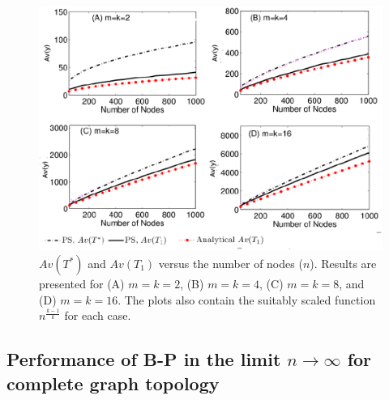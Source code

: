 \begin{figure}[htbp] 
\centering
\includegraphics[scale=0.36]{figs1/segSizeVsDelay_nrTrans_varyN_Mall_push_pull2.eps}
\caption{$Av(T^*)$ and $Av(T_1)$ versus the number of nodes ($n$). Results are presented for (A) $m=k=2$, (B) $m=k=4$, (C) $m=k=8$, and (D) $m=k=16$. The plots also contain the suitably scaled function $n^{\frac{k-1}{k}}$ for each case.}
\label{segSizeVsDelay_nrTrans_varyN_Mall_push_pull}
\end{figure}
\vspace{-3mm}
\subsection{Performance of B-P in the limit $n\rightarrow \infty$ for complete graph topology}
\vspace{-1mm}


